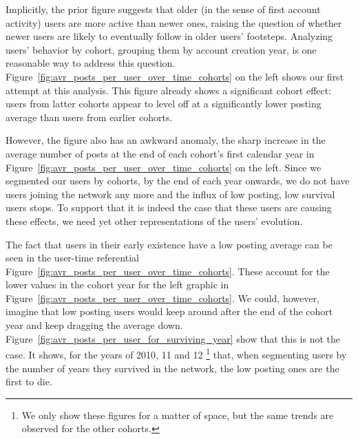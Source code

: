 

Implicitly, the prior figure suggests that older (in the sense of first account activity) users are more active than newer ones, raising the question of whether newer users
are likely to eventually follow in older users' footsteps.  Analyzing users' behavior by cohort, grouping them by account creation year, is one reasonable way to address this question.  Figure~\ref{fig:avr_posts_per_user_over_time_cohorts} on the left shows our first attempt at this analysis.  This figure already shows a significant cohort effect: users from latter cohorts appear to level off at a significantly lower posting average than users from earlier cohorts.  

However, the figure also has an awkward anomaly, the sharp increase in the average number of posts at the end of each cohort's first calendar year in Figure~\ref{fig:avr_posts_per_user_over_time_cohorts} on the left.  Since we segmented our users by cohorts, by the end of each year onwards, we do not have users joining the network any more and the influx of low posting, low survival users stops. To support that it is indeed the case that these users are causing these effects, we need yet other representations of the users' evolution.

The fact that users in their early existence have a low posting average can be seen in the user-time referential Figure~\ref{fig:avr_posts_per_user_over_time_cohorts}. These account for the lower values in the cohort year for the left graphic in Figure~\ref{fig:avr_posts_per_user_over_time_cohorts}. We could, however, imagine that low posting users would keep around after the end of the cohort year and keep dragging the average down. Figure~\ref{fig:avr_posts_per_user_for_surviving_year} show that this is not the case. It shows, for the years of 2010, 11 and 12 \footnote{We only show these figures for a matter of space, but the same trends are observed for the other cohorts.} that, when segmenting users by the number of years they survived in the network, the low posting ones are the first to die.



